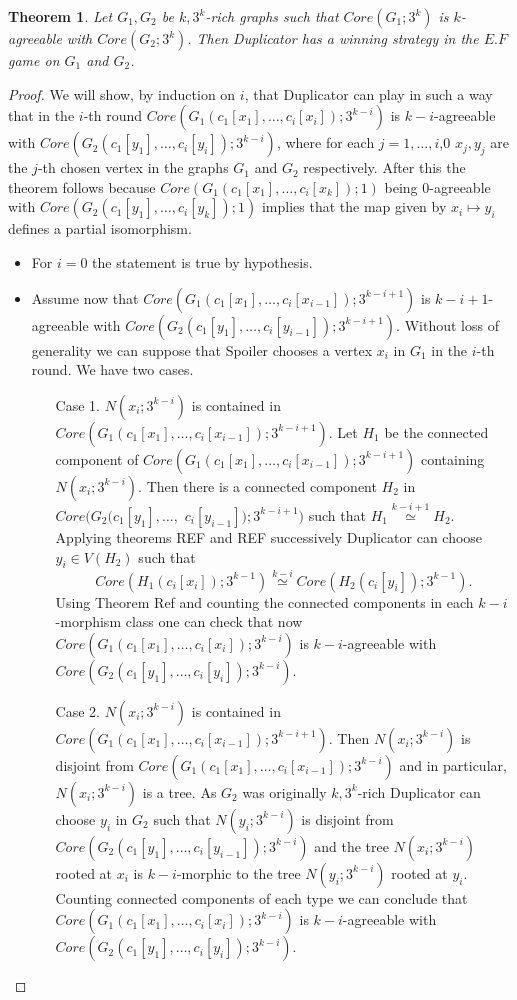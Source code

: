 \documentclass[11pt,notitlepage]{report}
\newtheorem{theorem}{Theorem}[chapter]
\theoremstyle{definition}
\theoremstyle{remark}
\newcommand{\morph}[1]{\stackrel{#1}{\simeq}}
\begin{document}
\begin{theorem} 
	Let $G_1, G_2$ be $k,3^k$-rich graphs such that $Core(G_1;3^k)$ is $k$-agreeable
	with $Core(G_2;3^k)$. Then Duplicator has a winning strategy in 
	the $E.F$ game on $G_1$ and $G_2$. 
\end{theorem}
\begin{proof}
	We will show, by induction on $i$, that Duplicator can play in such a way
	that in the $i$-th round $Core(G_1(c_1[x_1],\dots,c_i[x_i]);3^{k-i})$
	is $k-i$-agreeable with  $Core(G_2(c_1[y_1],\dots,c_i[y_i]);3^{k-i})$,
	where for each $j=1,\dots,i$,0 $x_j,y_j$ are the $j$-th 
	chosen vertex in the graphs $G_1$ and $G_2$	respectively. After this the theorem
	follows because
	$Core(G_1(c_1[x_1],\dots,c_i[x_k]);1)$ being $0$-agreeable with
	$Core(G_2(c_1[y_1],\dots,c_i[y_k]);1)$ implies that
	the map given by $x_i\mapsto y_i$ defines a partial isomorphism. \par
	\begin{itemize}[leftmargin=*]
		\item For $i=0$ the statement is true by hypothesis. 
		\item Assume now that $Core(G_1(c_1[x_1],\dots,c_i[x_{i-1}]);3^{k-i+1})$
		is $k-i+1$-agreeable with $Core(G_2(c_1[y_1],\dots, c_i[y_{i-1}]); 3^{k-i+1})$.
		Without loss of generality we can suppose that Spoiler chooses a vertex 
		$x_i$ in $G_1$ in the $i$-th round. We have two cases.
		\begin{itemize}[leftmargin=*]
			\item[Case 1.] $N(x_i;3^{k-i})$ is contained in 
			$Core(G_1(c_1[x_1],\dots,c_i[x_{i-1}]);3^{k-i+1})$.
			Let $H_1$ be the connected component of $Core(G_1(c_1[x_1],\dots,c_i[x_{i-1}]);3^{k-i+1})$
			containing $N(x_i;3^{k-i})$. Then there is a connected component $H_2$
			in $Core(G_2(c_1[y_1],\dots,$ $c_i[y_{i-1}]);3^{k-i+1})$ such that
			$H_1 \morph{k-i+1} H_2$. Applying theorems REF and REF successively Duplicator can choose
			$y_i\in V(H_2)$ such that 
			\[ Core(H_1(c_i[x_i]); 3^{k-1})\morph{k-i} Core(H_2(c_i[y_i]); 3^{k-1}).\]
			Using Theorem Ref and counting the connected components in each $k-i$-morphism class
			one can check that now $Core(G_1(c_1[x_1],\dots,c_i[x_i]);3^{k-i})$
			is $k-i$-agreeable with  $Core(G_2(c_1[y_1],\dots,c_i[y_i]);3^{k-i})$.
			\item[Case 2.] $N(x_i;3^{k-i})$ is contained in 
			$Core(G_1(c_1[x_1],\dots,c_i[x_{i-1}]);3^{k-i+1})$. Then
			$N(x_i;3^{k-i})$ is disjoint from $Core(G_1(c_1[x_1],\dots,c_i[x_{i-1}]);3^{k-i})$
			and in particular, $N(x_i;3^{k-i})$ is a tree. As $G_2$ was originally $k,3^k$-rich
			Duplicator can choose $y_i$ in $G_2$ such that $N(y_i;3^{k-i})$ is disjoint from 
			$Core(G_2(c_1[y_1],\dots,c_i[y_{i-1}]);3^{k-i})$ and the tree $N(x_i;3^{k-i})$
			rooted at $x_i$ is $k-i$-morphic to the tree $N(y_i;3^{k-i})$ rooted at $y_i$.
			Counting connected components of each type we can conclude that
			$Core(G_1(c_1[x_1],\dots,c_i[x_i]);3^{k-i})$
			is $k-i$-agreeable with  $Core(G_2(c_1[y_1],\dots,c_i[y_i]);3^{k-i})$.
		\end{itemize}  		
	\end{itemize}
	
\end{proof}
\end{document}
